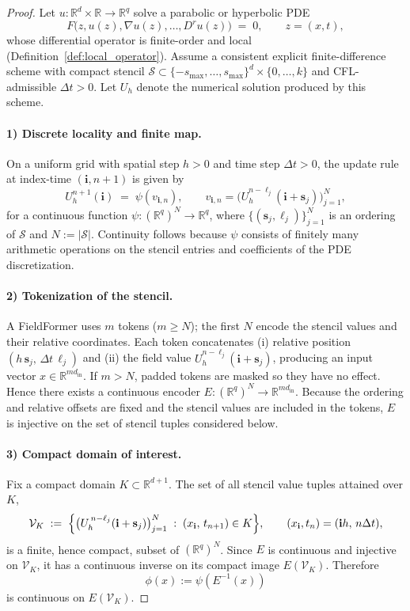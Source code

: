\begin{proof}[Proof]
Let $u:\mathbb{R}^{d}\times\mathbb{R}\to\mathbb{R}^q$ solve a parabolic or hyperbolic PDE
\[
F\bigl(z,u(z),\nabla u(z),\ldots,D^{r}u(z)\bigr) \;=\; 0,\qquad z=(x,t),
\]
whose differential operator is finite-order and local (Definition~\ref{def:local_operator}).
Assume a consistent explicit finite-difference scheme with compact stencil
$\mathcal{S}\subset\{-s_{\max},\ldots,s_{\max}\}^d\times\{0,\ldots,k\}$ and CFL-admissible $\Delta t>0$.
Let $U_h$ denote the numerical solution produced by this scheme.

\paragraph{1) Discrete locality and finite map.}
On a uniform grid with spatial step $h>0$ and time step $\Delta t>0$, the update rule at index-time $(\mathbf{i},n{+}1)$
is given by
\[
U_h^{n+1}(\mathbf{i}) \;=\;
\psi(v_{\mathbf{i},n}),\qquad
v_{\mathbf{i},n}
=
\bigl(U_h^{n-\ell_j}(\mathbf{i}+\mathbf{s}_j)\bigr)_{j=1}^{N},
\]
for a continuous function $\psi:(\mathbb{R}^{q})^{N}\to\mathbb{R}^{q}$, where $\{(\mathbf{s}_j,\ell_j)\}_{j=1}^{N}$ is an ordering of $\mathcal{S}$ and $N:=|\mathcal{S}|$.
Continuity follows because $\psi$ consists of finitely many arithmetic operations
on the stencil entries and coefficients of the PDE discretization.

\paragraph{2) Tokenization of the stencil.}
A FieldFormer uses $m$ tokens ($m\ge N$); the first $N$ encode the stencil
values and their relative coordinates. Each token concatenates
(i) relative position $(h\,\mathbf{s}_j,\,\Delta t\,\ell_j)$ and
(ii) the field value $U_h^{n-\ell_j}(\mathbf{i}+\mathbf{s}_j)$,
producing an input vector $x\in\mathbb{R}^{m d_{\mathrm{in}}}$.
If $m>N$, padded tokens are masked so they have no effect.
Hence there exists a continuous encoder
$E:(\mathbb{R}^{q})^{N}\to\mathbb{R}^{m d_{\mathrm{in}}}$.
Because the ordering and relative offsets are fixed and the stencil values are included in the tokens, $E$ is injective on the set of stencil tuples considered below.

\paragraph{3) Compact domain of interest.}
Fix a compact domain $K\subset\mathbb{R}^{d+1}$.
The set of all stencil value tuples attained over $K$,
\[
\mathcal{V}_K
\;:=\;
\Bigl\{
  \bigl(U_h^{\,n-\ell_j}(\mathbf{i}+\mathbf{s}_j)\bigr)_{j=1}^{N}
  \;:\;
  (x_{\mathbf{i}},\,t_{n+1}) \in K
\Bigr\},
\qquad (x_{\mathbf{i}},t_n) = (\mathbf{i}h,\, n\Delta t),
\]
is a finite, hence compact, subset of $(\mathbb{R}^{q})^{N}$. Since $E$ is continuous and injective on $\mathcal{V}_K$, it has a continuous inverse on its compact image $E(\mathcal{V}_K)$. Therefore
\[
\phi(x):=\psi(E^{-1}(x))
\]
is continuous on $E(\mathcal{V}_K)$.



\end{proof}
